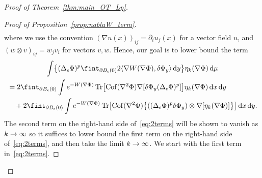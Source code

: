 \documentclass[10pt]{amsart}
\theoremstyle{definition}\newtheorem{defi}[theo]{Definition}\newtheorem{rema}[theo]{Remark}\newtheorem{exam}[theo]{Example}\newtheorem{exem}[theo]{Example}\newtheorem{nota}[theo]{Notation}
\DeclareMathOperator{\Tr}{Tr}
\DeclareMathOperator{\Cof}{Cof}
\newcommand{\W}{W}
\newcommand{\source}{\mu}
\newcommand*\diff{\mathop{}\!\mathrm{d}}
\newcommand{\OT}{\Phi}
\newcommand{\avgint}{\fint}
\newcommand{\findiff}{\delta\OT}
\renewcommand*{\to}{\mathchoice{\longrightarrow}{\rightarrow}{\rightarrow}{\rightarrow}}
\let\originalleft\left
\let\originalright\right
\renewcommand{\left}{\mathopen{}\mathclose\bgroup\originalleft}
\renewcommand{\right}{\aftergroup\egroup\originalright}
\begin{document}
\begin{proof}[Proof of Theorem~\ref{thm:main_OT_Lp}]
\begin{proof}[Proof of Proposition~\ref{prop:nablaW_term}]
\begin{multline*}
\end{multline*}
where we use the convention $(\nabla u(x))_{ij}=\partial_iu_j(x)$ for a vector field $u$, and $(w\otimes v)_{ij}=w_jv_i$ for vectors $v,w$. Hence, our goal is to lower bound the term
\begin{multline}\label{eq:2terms}
\int\left\{ (\Delta_{\epsilon}\OT)^p\avgint_{\partial B_{\epsilon}(0)}2\langle \nabla\W(\nabla \OT),\findiff_y\rangle\diff y\right\}\eta_k(\nabla\OT)\diff \source\\
\begin{aligned}
&=2\avgint_{\partial B_{\epsilon}(0)}\int e^{-\W(\nabla\OT)} \Tr\left[\Cof(\nabla^2\OT)\nabla[\findiff_y(\Delta_{\epsilon}\OT)^p]\right]\eta_k(\nabla\OT)\diff x\diff y\\
&\quad+2\avgint_{\partial B_{\epsilon}(0)}\int e^{-\W(\nabla\OT)} \Tr\left[\Cof(\nabla^2\OT)\bigl\{\left((\Delta_{\epsilon}\OT)^p\findiff_y\right)\otimes\nabla[\eta_k(\nabla\OT)]\bigr\}\right]\diff x\diff y.
\end{aligned}
\end{multline}
The second term on the right-hand side of~\eqref{eq:2terms} will be shown to vanish as $k\to\infty$ so it suffices to lower bound the first term on the right-hand side of~\eqref{eq:2terms}, and then take the limit $k\to \infty$. We start with the first term in~\eqref{eq:2terms}.


\end{proof}
\end{proof}
\end{document}
